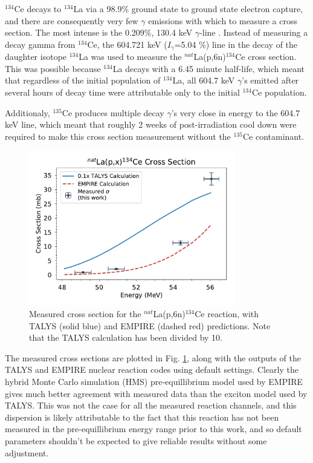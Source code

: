 \documentclass[aps,twocolumn,secnumarabic,balancelastpage,amsmath,amssymb,nofootinbib,floatfix]{revtex4-1}
\begin{document}
$^{134}$Ce decays to $^{134}$La via a 98.9\% ground state to ground state electron capture, and there are consequently very few $\gamma$ emissions with which to measure a cross section.  The most intense is the 0.209\%, 130.4 keV $\gamma$-line \cite{ensdf}.  Instead of measuring a decay gamma from $^{134}$Ce, the 604.721 keV ($I_{\gamma}$=5.04 \%) line in the decay of the daughter isotope $^{134}$La was used to measure the $^{nat}$La(p,6n)$^{134}$Ce cross section.  This was possible because $^{134}$La decays with a 6.45 minute half-life, which meant that regardless of the initial population of $^{134}$La, all 604.7 keV $\gamma$'s emitted after several hours of decay time were attributable only to the initial $^{134}$Ce population.

Additionaly, $^{135}$Ce produces multiple decay $\gamma$'s very close in energy to the 604.7 keV line, which meant that roughly 2 weeks of post-irradiation cool down were required to make this cross section measurement without the $^{135}$Ce contaminant.

\begin{figure}[htb]
\includegraphics[width=9cm]{cross_sections/134CE}
\caption{Measured cross section for the $^{nat}$La(p,6n)$^{134}$Ce reaction, with TALYS (solid blue) and EMPIRE (dashed red) predictions.  Note that the TALYS calculation has been divided by 10.
}
\label{fig:134CE}
\end{figure}

The measured cross sections are plotted in Fig. \ref{fig:134CE}, along with the outputs of the TALYS and EMPIRE nuclear reaction codes using default settings.  Clearly the hybrid Monte Carlo simulation (HMS) pre-equillibrium model used by EMPIRE gives much better agreement with measured data than the exciton model used by TALYS.  This was not the case for all the measured reaction channels, and this dispersion is likely attributable to the fact that this reaction has not been measured in the pre-equillibrium energy range prior to this work, and so default parameters shouldn't be expected to give reliable results without some adjustment.
\end{document}
